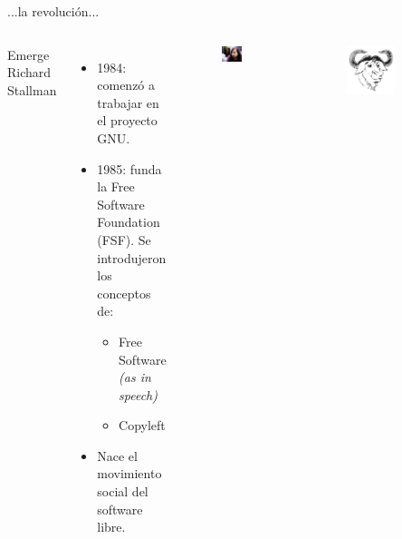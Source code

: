 \documentclass{beamer}
\begin{document}
\begin{frame}{...la revolución...}
  \begin{columns}
     Emerge Richard Stallman
    \begin{itemize}
    \item 1984: comenzó a trabajar en el proyecto GNU.
    \item 1985: funda la Free Software Foundation (FSF). Se introdujeron los conceptos de:
      \begin{itemize}
      \item Free Software \emph{(as in speech)}
      \item Copyleft
      \end{itemize}
    \item Nace el \alert{movimiento social} del software libre.
    \end{itemize}

    \begin{figure}
      \centering
      \includegraphics[width=0.6\textwidth]{pics/Richard_Matthew_Stallman.jpeg}
    \end{figure}
    \begin{figure}
      \centering
      \includegraphics[width=0.6\textwidth]{pics/Official_gnu.pdf}
    \end{figure}
  \end{columns}
\end{frame}
\end{document}

